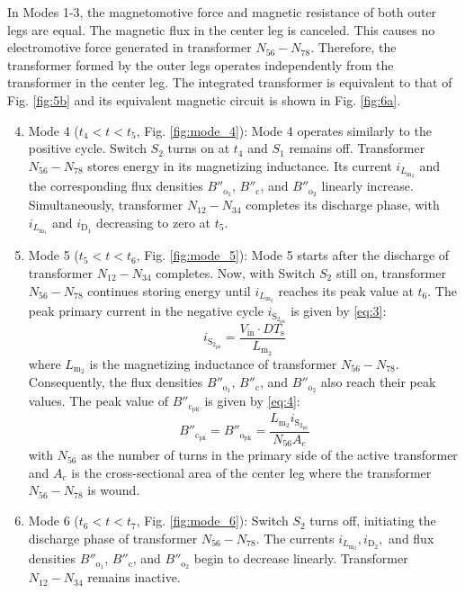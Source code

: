 \documentclass[lettersize,journal]{IEEEtran}
\begin{document}
In Modes 1-3, the magnetomotive force and magnetic resistance of both outer legs are equal. The magnetic flux in the center leg is canceled. This causes no electromotive force generated in transformer $N_{56}-N_{78}$. Therefore, the transformer formed by the outer legs operates independently from the transformer in the center leg. The integrated transformer is equivalent to that of Fig. \ref{fig:5b} and its equivalent magnetic circuit is shown in Fig. \ref{fig:6a}.

\begin{enumerate}
    \setcounter{enumi}{3} %
    \item Mode 4 ($t_4 < t < t_5$, Fig. \ref{fig:mode_4}): Mode 4 operates similarly to the positive cycle. Switch $S_2$ turns on at $t_4$ and $S_1$ remains off. Transformer $N_{56}-N_{78}$ stores energy in its magnetizing inductance. Its current $i_{L_{\mathrm{m}_2}}$ and the corresponding flux densities $B''_{\mathrm{o}_1}$, $B''_{\mathrm{c}}$, and $B''_{\mathrm{o}_2}$ linearly increase. Simultaneously, transformer $N_{12}-N_{34}$ completes its discharge phase, with $i_{L_{\mathrm{m}_1}}$ and $i_{\mathrm{D}_1}$ decreasing to zero at $t_5$.

    \item Mode 5 ($t_5 < t < t_6$, Fig. \ref{fig:mode_5}): Mode 5 starts after the discharge of transformer $N_{12}-N_{34}$ completes. Now, with Switch $S_2$ still on, transformer $N_{56}-N_{78}$ continues storing energy until $i_{L_{\mathrm{m}_2}}$ reaches its peak value at $t_6$. The peak primary current in the negative cycle $i_{\mathrm{S}_{2_{\mathrm{pk}}}}$ is given by \eqref{eq:3}:
    \begin{equation}
    \label{eq:3}
    i_{\mathrm{S}_{2_{\mathrm{pk}}}} = \frac{V_{\mathrm{in}} \cdot DT_{\mathrm{s}}}{L_{\mathrm{m}_2}}
    \end{equation}
    where $L_{\mathrm{m}_2}$ is the magnetizing inductance of transformer $N_{56}-N_{78}$. Consequently, the flux densities $B''_{\mathrm{o}_1}$, $B''_{\mathrm{c}}$, and $B''_{\mathrm{o}_2}$ also reach their peak values. The peak value of $B''_{\mathrm{c}_{\mathrm{pk}}}$ is given by \eqref{eq:4}:
    \begin{equation}
    \label{eq:4}
    B''_{\mathrm{c}_{\mathrm{pk}}} = B''_{\mathrm{o}_{\mathrm{pk}}} = \frac{L_{\mathrm{m}_2} i_{\mathrm{S}_{2_{\mathrm{pk}}}}}{N_{56} A_{\mathrm{c}}}
    \end{equation}
    with $N_{56}$ as the number of turns in the primary side of the active transformer and $A_{\mathrm{c}}$ is the cross-sectional area of the center leg where the transformer $N_{56}-N_{78}$ is wound.

    \item Mode 6 ($t_6 < t < t_7$, Fig. \ref{fig:mode_6}): Switch $S_2$ turns off, initiating the discharge phase of transformer $N_{56}-N_{78}$. The currents $i_{L_{\mathrm{m}_2}}, i_{\mathrm{D}_2},$ and flux densities $B''_{\mathrm{o}_1}$, $B''_{\mathrm{c}}$, and $B''_{\mathrm{o}_2}$ begin to decrease linearly. Transformer $N_{12}-N_{34}$ remains inactive.
\end{enumerate}
\end{document}
